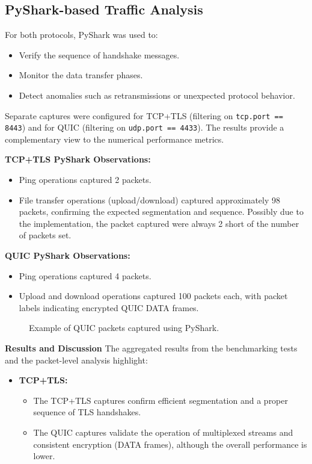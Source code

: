 \subsection{PyShark-based Traffic Analysis}
For both protocols, PyShark was used to:
\begin{itemize}
    \item Verify the sequence of handshake messages.
    \item Monitor the data transfer phases.
    \item Detect anomalies such as retransmissions or unexpected protocol behavior.
\end{itemize}
Separate captures were configured for TCP+TLS (filtering on \texttt{tcp.port == 8443}) and for QUIC (filtering on \texttt{udp.port == 4433}). The results provide a complementary view to the numerical performance metrics.
\newline

\textbf{TCP+TLS PyShark Observations:}
\begin{itemize}
    \item Ping operations captured 2 packets.
    \item File transfer operations (upload/download) captured approximately 98 packets, confirming the expected segmentation and sequence. Possibly due to the implementation, the packet captured were always 2 short of the number of packets set.
\end{itemize}

\textbf{QUIC PyShark Observations:}
\begin{itemize}
    \item Ping operations captured 4 packets.
    \item Upload and download operations captured 100 packets each, with packet labels indicating encrypted QUIC DATA frames.
\end{itemize}

\begin{figure}[h]
	\centering
	\caption{Example of QUIC packets captured using PyShark.}
\end{figure}

\noindent \textbf{Results and Discussion} \newline
The aggregated results from the benchmarking tests and the packet-level analysis highlight:
\begin{itemize}
    \item \textbf{TCP+TLS:}  
    \begin{itemize}        
        \item The TCP+TLS captures confirm efficient segmentation and a proper sequence of TLS handshakes.
        \item The QUIC captures validate the operation of multiplexed streams and consistent encryption (DATA frames), although the overall performance is lower.
    \end{itemize}
\end{itemize}